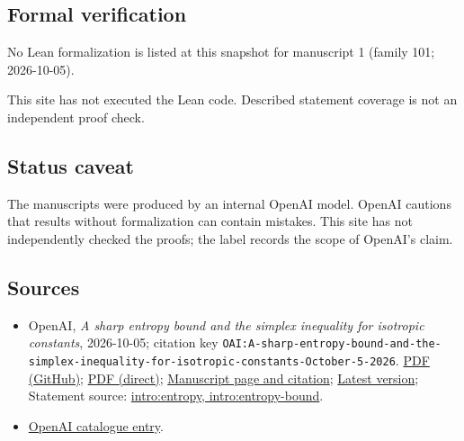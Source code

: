 \documentclass[11pt]{article}
\begin{document}
\subsection{Formal verification}
No Lean formalization is listed at this snapshot for manuscript 1 (family 101; 2026-10-05).

This site has not executed the Lean code. Described statement coverage is not an independent proof check.

\subsection{Status caveat}
The manuscripts were produced by an internal OpenAI model. OpenAI cautions that results without formalization can contain mistakes. This site has not independently checked the proofs; the label records the scope of OpenAI's claim.

\subsection{Sources}
\begin{itemize}
\item OpenAI, \emph{A sharp entropy bound and the simplex inequality for isotropic constants}, 2026-10-05; citation key \texttt{OAI:A-sharp-entropy-bound-and-the-simplex-inequality-for-isotropic-constants-October-5-2026}. \href{https://github.com/openai/math/blob/adc7f1241b42e322a6451854ab7e4b4c146bf78a/preprints/A-sharp-entropy-bound-and-the-simplex-inequality-for-isotropic-constants-October-5-2026/isotropic-simplex.pdf}{PDF (GitHub)}; \href{https://github.com/openai/math/raw/adc7f1241b42e322a6451854ab7e4b4c146bf78a/preprints/A-sharp-entropy-bound-and-the-simplex-inequality-for-isotropic-constants-October-5-2026/isotropic-simplex.pdf}{PDF (direct)}; \href{https://github.com/openai/math/blob/adc7f1241b42e322a6451854ab7e4b4c146bf78a/preprints/A-sharp-entropy-bound-and-the-simplex-inequality-for-isotropic-constants-October-5-2026/README.md}{Manuscript page and citation}; \href{https://github.com/openai/math/blob/main/preprints/A-sharp-entropy-bound-and-the-simplex-inequality-for-isotropic-constants-October-5-2026/isotropic-simplex.pdf}{Latest version}; Statement source: \href{https://github.com/openai/math/blob/adc7f1241b42e322a6451854ab7e4b4c146bf78a/preprints/A-sharp-entropy-bound-and-the-simplex-inequality-for-isotropic-constants-October-5-2026/build/manuscript/introduction.tex\#L75}{intro:entropy, intro:entropy-bound}.
\item \href{https://github.com/openai/math/blob/adc7f1241b42e322a6451854ab7e4b4c146bf78a/CONTENTS.md}{OpenAI catalogue entry}.
\end{itemize}
\end{document}
